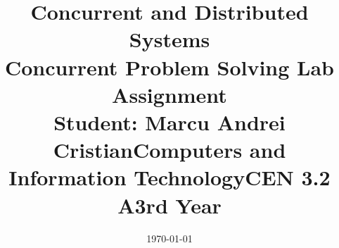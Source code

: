 \documentclass[14pt]{article}
\begin{document}
\title{%
  \huge Concurrent and Distributed Systems \\
  \vspace{20mm}
  \large Concurrent Problem Solving Lab Assignment \\}

\date{\today}
\maketitle
\begin{center}
\vspace{30 mm}

\title{\huge Student: Marcu Andrei Cristian}
\\\vspace{10 mm}
\title{\huge Computers and Information Technology}
\\\vspace{10 mm}
\title{\huge CEN 3.2 A}
\\\vspace{10 mm}
\title{\huge 3rd Year}
\end{center}
\date{}
\maketitle

\newpage
\end{document}
